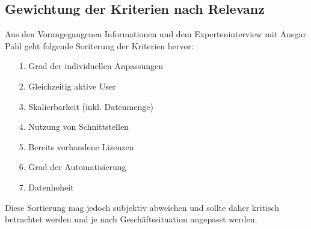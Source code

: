 \documentclass[12pt,bibtotoc]{article}
\begin{document}
		\subsection{Gewichtung der Kriterien nach Relevanz}
		Aus den Vorangegangenen Informationen und dem Experteninterview mit Ansgar Pahl \cite{Anhang} geht folgende Soriterung der Kriterien hervor:
		\begin{itemize}
			\item[1.] Grad der individuellen Anpassungen
			\item[2.] Gleichzeitig aktive User
			\item[3.] Skalierbarkeit (inkl. Datenmenge)
			\item[4.] Nutzung von Schnittstellen
			\item[5.] Bereits vorhandene Lizenzen
			\item[6.] Grad der Automatisierung
			\item[7.] Datenhoheit 
		\end{itemize}
		Diese Sortierung mag jedoch subjektiv abweichen und sollte daher kritisch betrachtet werden und je nach Geschäftssituation angepasst werden.
		\newpage
\end{document}

